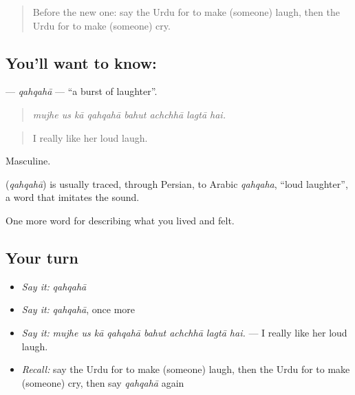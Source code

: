 \label{lesson:UR-C453-qahqaha}



\begin{quote}
Before the new one: say the Urdu for to make (someone) laugh, then the Urdu for to make (someone) cry.
\end{quote}

\subsection*{You'll want to know: }
\textbf{} — \emph{qahqahā} — \textquotedblleft{}a burst of laughter\textquotedblright{}.

\begin{quote}
       
\end{quote}

\begin{quote}
\emph{mujhe us kā qahqahā bahut achchhā lagtā hai.}
\end{quote}

\begin{quote}
I really like her loud laugh.
\end{quote}

Masculine.

\begin{cousinweb}
\textbf{} (\emph{qahqahā}) is usually traced, through Persian, to Arabic \emph{qahqaha}, \textquotedblleft{}loud laughter\textquotedblright{}, a word that imitates the sound.
\end{cousinweb}

\begin{grammarlens}[title={What you've built}]
One more word for describing what you lived and felt.
\end{grammarlens}

\subsection*{Your turn}
\begin{itemize}
\raggedright
  \item \emph{Say it:} \emph{qahqahā}
  \item \emph{Say it:} \emph{qahqahā}, once more
  \item \emph{Say it:} \emph{mujhe us kā qahqahā bahut achchhā lagtā hai.} — I really like her loud laugh.
  \item \emph{Recall:} say the Urdu for to make (someone) laugh, then the Urdu for to make (someone) cry, then say \emph{qahqahā} again
\end{itemize}

